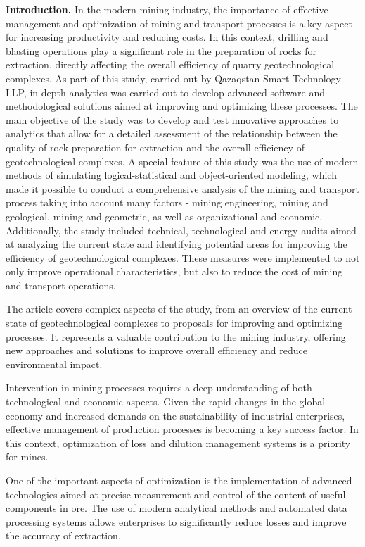 \begin{multicols}{2}
{\bfseries Introduction.} In the modern mining industry, the importance of
effective management and optimization of mining and transport processes
is a key aspect for increasing productivity and reducing costs. In this
context, drilling and blasting operations play a significant role in the
preparation of rocks for extraction, directly affecting the overall
efficiency of quarry geotechnological complexes. As part of this study,
carried out by Qazaqstan Smart Technology LLP, in-depth analytics was
carried out to develop advanced software and methodological solutions
aimed at improving and optimizing these processes. The main objective of
the study was to develop and test innovative approaches to analytics
that allow for a detailed assessment of the relationship between the
quality of rock preparation for extraction and the overall efficiency of
geotechnological complexes. A special feature of this study was the use
of modern methods of simulating logical-statistical and object-oriented
modeling, which made it possible to conduct a comprehensive analysis of
the mining and transport process taking into account many factors -
mining engineering, mining and geological, mining and geometric, as well
as organizational and economic. Additionally, the study included
technical, technological and energy audits aimed at analyzing the
current state and identifying potential areas for improving the
efficiency of geotechnological complexes. These measures were
implemented to not only improve operational characteristics, but also to
reduce the cost of mining and transport operations.

The article covers complex aspects of the study, from an overview of the
current state of geotechnological complexes to proposals for improving
and optimizing processes. It represents a valuable contribution to the
mining industry, offering new approaches and solutions to improve
overall efficiency and reduce environmental impact.

Intervention in mining processes requires a deep understanding of both
technological and economic aspects. Given the rapid changes in the
global economy and increased demands on the sustainability of industrial
enterprises, effective management of production processes is becoming a
key success factor. In this context, optimization of loss and dilution
management systems is a priority for mines.

One of the important aspects of optimization is the implementation of
advanced technologies aimed at precise measurement and control of the
content of useful components in ore. The use of modern analytical
methods and automated data processing systems allows enterprises to
significantly reduce losses and improve the accuracy of extraction.


\end{multicols}
